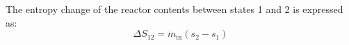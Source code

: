 The entropy change of the reactor contents between states 1 and 2 is expressed as:  
\[
\Delta S_{12} = \dot{m}_{\text{in}} \left( s_2 - s_1 \right)
\]